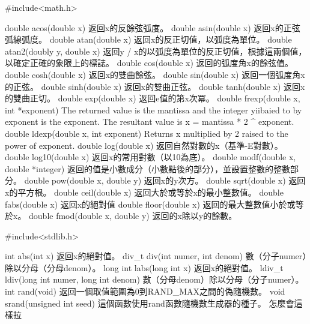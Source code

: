 #include<math.h>

double acos(double x) 返回x的反餘弦弧度。
double asin(double x) 返回x的正弦弧線弧度。
double atan(double x) 返回x的反正切值，以弧度為單位。
double atan2(doubly y, double x) 返回y / x的以弧度為單位的反正切值，根據這兩個值，以確定正確的象限上的標誌。
double cos(double x) 返回的弧度角x的餘弦值。
double cosh(double x) 返回x的雙曲餘弦。
double sin(double x) 返回一個弧度角x的正弦。
double sinh(double x) 返回x的雙曲正弦。
double tanh(double x) 返回x的雙曲正切。
double exp(double x) 返回e值的第x次冪。
double frexp(double x, int *exponent)
The returned value is the mantissa and the integer yiibaied to by exponent is the exponent. The resultant value is x = mantissa * 2 ^ exponent.
double ldexp(double x, int exponent)
Returns x multiplied by 2 raised to the power of exponent.
double log(double x) 返回自然對數的x（基準-E對數）。
double log10(double x) 返回x的常用對數（以10為底）。
double modf(double x, double *integer) 返回的值是小數成分（小數點後的部分），並設置整數的整數部分。
double pow(double x, double y) 返回x的y次方。
double sqrt(double x) 返回x的平方根。
double ceil(double x) 返回大於或等於x的最小整數值。
double fabs(double x) 返回x的絕對值
double floor(double x) 返回的最大整數值小於或等於x。
double fmod(double x, double y) 返回的x除以y的餘數。

#include<stdlib.h>

int abs(int x) 返回x的絕對值。
div_t div(int numer, int denom) 數（分子numer）除以分母（分母denom）。
long int labs(long int x) 返回x的絕對值。
ldiv_t ldiv(long int numer, long int denom) 數（分母denom）除以分母（分子numer）。
int rand(void) 返回一個取值範圍為0到RAND_MAX之間的偽隨機數。
void srand(unsigned int seed) 這個函數使用rand函數隨機數生成器的種子。
怎麼會這樣拉